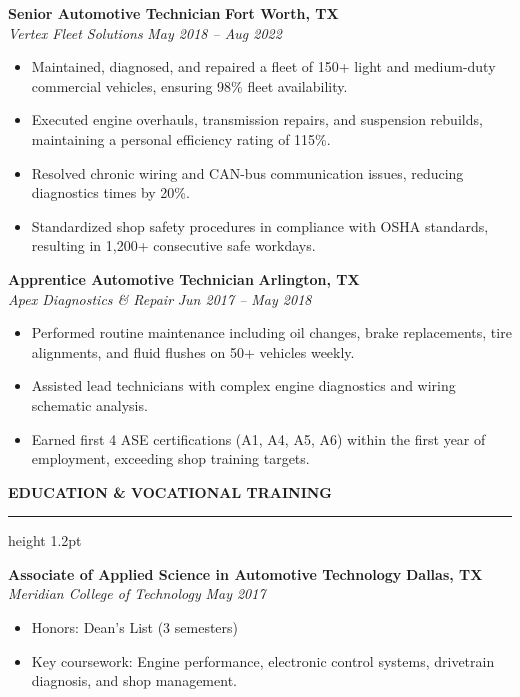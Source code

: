 \documentclass[10pt]{article}
\newcommand{\resumesection}[1]{%
  \vspace{6pt}%
  {\color{accent}\large\bfseries\MakeUppercase{#1}}%
  \vspace{1.5pt}%
  \hrule height 1.2pt%
  \vspace{3.5pt}%
}
\newcommand{\experience}[4]{%
  \vspace{3.5pt}%
  \noindent\textbf{#1} \hfill \textbf{#3} \\
  \noindent\textit{#2} \hfill \textit{#4} \\
  \vspace{1.5pt}%
}
\begin{document}
\experience{Senior Automotive Technician}{Vertex Fleet Solutions}{Fort Worth, TX}{May 2018 -- Aug 2022}
\begin{itemize}[leftmargin=10pt, topsep=0pt, itemsep=1.5pt, parsep=0pt]
    \item Maintained, diagnosed, and repaired a fleet of 150+ light and medium-duty commercial vehicles, ensuring 98\% fleet availability.
    \item Executed engine overhauls, transmission repairs, and suspension rebuilds, maintaining a personal efficiency rating of 115\%.
    \item Resolved chronic wiring and CAN-bus communication issues, reducing diagnostics times by 20\%.
    \item Standardized shop safety procedures in compliance with OSHA standards, resulting in 1,200+ consecutive safe workdays.
\end{itemize}

\experience{Apprentice Automotive Technician}{Apex Diagnostics \& Repair}{Arlington, TX}{Jun 2017 -- May 2018}
\begin{itemize}[leftmargin=10pt, topsep=0pt, itemsep=1.5pt, parsep=0pt]
    \item Performed routine maintenance including oil changes, brake replacements, tire alignments, and fluid flushes on 50+ vehicles weekly.
    \item Assisted lead technicians with complex engine diagnostics and wiring schematic analysis.
    \item Earned first 4 ASE certifications (A1, A4, A5, A6) within the first year of employment, exceeding shop training targets.
\end{itemize}

\resumesection{Education \& Vocational Training}
\experience{Associate of Applied Science in Automotive Technology}{Meridian College of Technology}{Dallas, TX}{May 2017}
\begin{itemize}[leftmargin=10pt, topsep=0pt, itemsep=1.5pt, parsep=0pt]
    \item Honors: Dean's List (3 semesters)
    \item Key coursework: Engine performance, electronic control systems, drivetrain diagnosis, and shop management.
\end{itemize}
\end{document}
